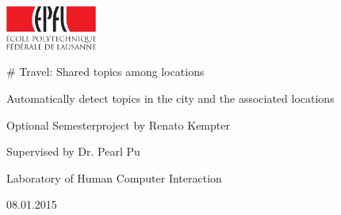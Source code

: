 \begin{flushright}
\includegraphics[width=3cm]{Logos/logo_epfl_coul-crop}
\end{flushright}

\vspace{1cm}

\begin{center}

\vspace{1cm}

\LARGE
\# Travel: Shared topics among locations

\vspace{2cm}

Automatically detect topics in the city and the associated
locations

\vspace{1cm}

\large

\vspace{0.5cm}

Optional Semesterproject by Renato Kempter\\

\vspace{0.5cm}

Supervised by Dr. Pearl Pu

Laboratory of Human Computer Interaction

\vspace{1cm}

08.01.2015\\


\end{center}
\normalsize